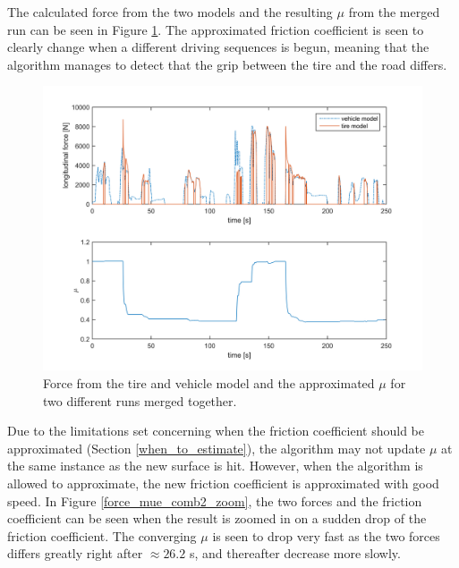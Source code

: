 The calculated force from the two models and the resulting $ \mu $ from the merged run can be seen in Figure \ref{force_mue_comb2}. The approximated friction coefficient is seen to clearly change when a different driving sequences is begun, meaning that the algorithm manages to detect that the grip between the tire and the road differs.
 
\begin{figure}[h]
	\centering
	\includegraphics[width=1.0\textwidth]{Pictures/force_mue_comb2}
	\caption {Force from the tire and vehicle model and the approximated $ \mu $ for two different runs merged together.}
	\label{force_mue_comb2}
\end{figure}

Due to the limitations set concerning when the friction coefficient should be approximated (Section \ref{when_to_estimate}), the algorithm may not update $ \mu $ at the same instance as the new surface is hit. However, when the algorithm is allowed to approximate, the new friction coefficient is approximated with good speed. In Figure \ref{force_mue_comb2_zoom}, the two forces and the friction coefficient can be seen when the result is zoomed in on a sudden drop of the friction coefficient. The converging $ \mu $ is seen to drop very fast as the two forces differs greatly right after $ \approx 26.2 $ s, and thereafter decrease more slowly. 

